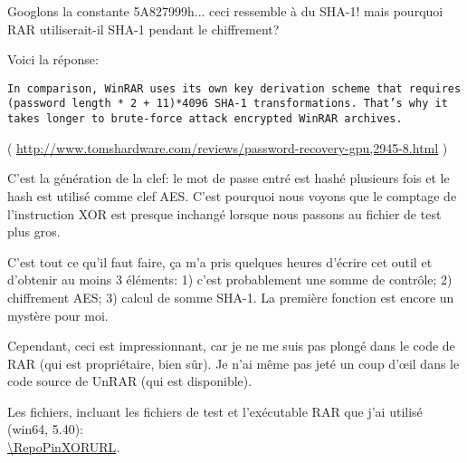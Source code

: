 Googlons la constante 5A827999h... ceci ressemble à du SHA-1! mais pourquoi RAR utiliserait-il
SHA-1 pendant le chiffrement?

Voici la réponse:

\begin{lstlisting}
In comparison, WinRAR uses its own key derivation scheme that requires (password length * 2 + 11)*4096 SHA-1 transformations. That’s why it takes longer to brute-force attack encrypted WinRAR archives.
\end{lstlisting}
( \url{http://www.tomshardware.com/reviews/password-recovery-gpu,2945-8.html} )

C'est la génération de la clef: le mot de passe entré est hashé plusieurs fois et
le hash est utilisé comme clef \ac{AES}.
C'est pourquoi nous voyons que le comptage de l'instruction XOR est presque inchangé
lorsque nous passons au fichier de test plus gros.

C'est tout ce qu'il faut faire, ça m'a pris quelques heures d'écrire cet outil et
d'obtenir au moins 3 éléments: 1) c'est probablement une somme de contrôle; 2) chiffrement
\ac{AES}; 3) calcul de somme SHA-1.
La première fonction est encore un mystère pour moi.

Cependant, ceci est impressionnant, car je ne me suis pas plongé dans le code de
RAR (qui est propriétaire, bien sûr). Je n'ai même pas jeté un coup d'\oe{}il dans
le code source de UnRAR (qui est disponible).

Les fichiers, incluant les fichiers de test et l'exécutable RAR que j'ai utilisé (win64, 5.40): \\
\url{\RepoPinXORURL}.

